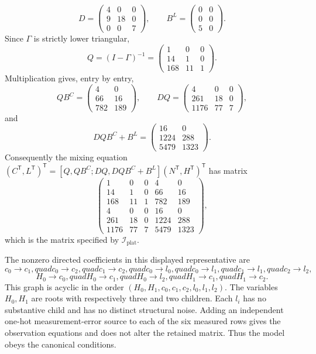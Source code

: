 \[
D=
\begin{pmatrix}
4&0&0\\
9&18&0\\
0&0&7
\end{pmatrix},\qquad
B^{L}=
\begin{pmatrix}
0&0\\
0&0\\
5&0
\end{pmatrix}.
\]
Since \(\Gamma\) is strictly lower triangular,
\[
Q=(I-\Gamma)^{-1}
=
\begin{pmatrix}
1&0&0\\
14&1&0\\
168&11&1
\end{pmatrix}.
\]
Multiplication gives, entry by entry,
\[
QB^{C}=
\begin{pmatrix}
4&0\\
66&16\\
782&189
\end{pmatrix},\qquad
DQ=
\begin{pmatrix}
4&0&0\\
261&18&0\\
1176&77&7
\end{pmatrix},
\]
and
\[
DQ B^{C}+B^{L}=
\begin{pmatrix}
16&0\\
1224&288\\
5479&1323
\end{pmatrix}.
\]
Consequently the mixing equation \((C^{\mathsf T},L^{\mathsf T})^{\mathsf T}=[Q,QB^{C};DQ,DQB^{C}+B^{L}](N^{\mathsf T},H^{\mathsf T})^{\mathsf T}\) has matrix
\[
\begin{pmatrix}
1&0&0&4&0\\
14&1&0&66&16\\
168&11&1&782&189\\
4&0&0&16&0\\
261&18&0&1224&288\\
1176&77&7&5479&1323
\end{pmatrix},
\]
which is the matrix specified by \(\mathcal I_{\mathrm{plat}}\).

The nonzero directed coefficients in this displayed representative are
\[
c_0\to c_1,quad c_0\to c_2,quad c_1\to c_2,quad
c_0\to l_0,quad c_0\to l_1,quad c_1\to l_1,quad c_2\to l_2,
\]
\[
H_0\to c_0,quad H_0\to c_1,quad H_0\to l_2,quad
H_1\to c_1,quad H_1\to c_2.
\]
This graph is acyclic in the order \((H_0,H_1,c_0,c_1,c_2,l_0,l_1,l_2)\).  The variables \(H_0,H_1\) are roots with respectively three and two children.  Each \(l_i\) has no substantive child and has no distinct structural noise.  Adding an independent one-hot measurement-error source to each of the six measured rows gives the observation equations and does not alter the retained matrix.  Thus the model obeys the canonical conditions.

